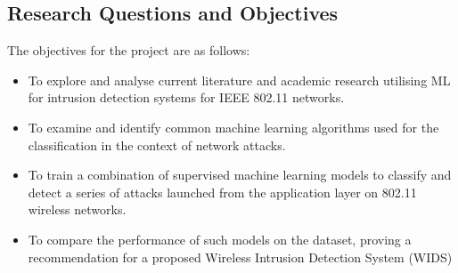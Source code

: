 \subsection{Research Questions and Objectives}
\label{sec:Research Question}

The objectives for the project are as follows:
\begin{itemize}
\item To explore and analyse current literature and academic research utilising ML for intrusion detection systems for IEEE 802.11 networks.
\end{itemize}
\begin{itemize}
\item To examine and identify common machine learning algorithms used for the classification in the context of network attacks.
\end{itemize}
\begin{itemize}
\item To train a combination of supervised machine learning models to classify and detect a series of attacks launched from the application layer on 802.11 wireless networks.
\item To compare the performance of such models on the dataset, proving a recommendation for a proposed Wireless Intrusion Detection System (WIDS)
\end{itemize}

